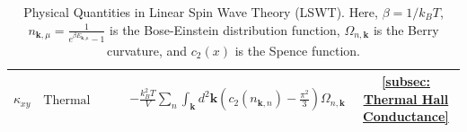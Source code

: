 \begin{table}[!h]
\begin{tabular}{c|c|c|c}
    $\kappa_{xy}$ 
    & $\text{Thermal Hall conductivity}$
    & $ - \frac{k_{B}^2 T}{V} \sum_{n} \int_{\mathbf{k}} d^{2} \mathbf{k} \left( c_2(n_{\mathbf{k}, n}) - \frac{\pi^2}{3} \right) \Omega_{n, \mathbf{k}}$ 
    &  \ref{subsec: Thermal Hall Conductance} \\
    \hline\hline
    \end{tabular}
    \caption{Physical Quantities in Linear Spin Wave Theory (LSWT). 
    Here, $\beta = 1/k_{B}T$,
    $n_{\mathbf{k}, \mu} = \frac{1}{e^{\beta E_{\mathbf{k}, \mu}} - 1}$ is the Bose-Einstein distribution function,
    $\Omega_{n, \mathbf{k}}$ is the Berry curvature, and 
    $c_2(x)$ is the Spence function.
    }
    \label{tab:lswt_quantities}
\end{table}









\newpage
